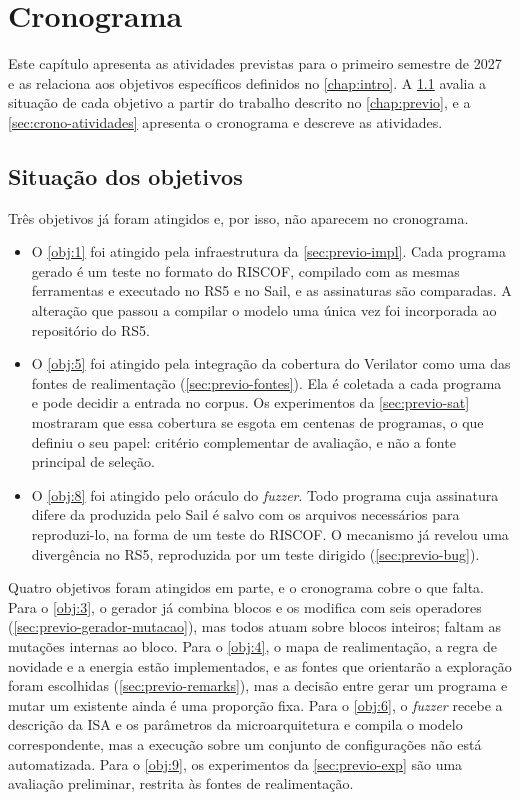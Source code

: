 \chapter{\label{chap:cronograma}Cronograma}

Este capítulo apresenta as atividades previstas para o primeiro semestre de 2027 e as relaciona aos objetivos específicos definidos no \cref{chap:intro}. A \cref{sec:crono-objetivos} avalia a situação de cada objetivo a partir do trabalho descrito no \cref{chap:previo}, e a \cref{sec:crono-atividades} apresenta o cronograma e descreve as atividades.

\section{Situação dos objetivos}\label{sec:crono-objetivos}

Três objetivos já foram atingidos e, por isso, não aparecem no cronograma.

\begin{itemize}
    \item O \cref{obj:1} foi atingido pela infraestrutura da \cref{sec:previo-impl}. Cada programa gerado é um teste no formato do RISCOF, compilado com as mesmas ferramentas e executado no RS5 e no Sail, e as assinaturas são comparadas. A alteração que passou a compilar o modelo uma única vez foi incorporada ao repositório do RS5.

    \item O \cref{obj:5} foi atingido pela integração da cobertura do Verilator como uma das fontes de realimentação (\cref{sec:previo-fontes}). Ela é coletada a cada programa e pode decidir a entrada no corpus. Os experimentos da \cref{sec:previo-sat} mostraram que essa cobertura se esgota em centenas de programas, o que definiu o seu papel: critério complementar de avaliação, e não a fonte principal de seleção.

    \item O \cref{obj:8} foi atingido pelo oráculo do \textit{fuzzer}. Todo programa cuja assinatura difere da produzida pelo Sail é salvo com os arquivos necessários para reproduzi-lo, na forma de um teste do RISCOF. O mecanismo já revelou uma divergência no RS5, reproduzida por um teste dirigido (\cref{sec:previo-bug}).
\end{itemize}

Quatro objetivos foram atingidos em parte, e o cronograma cobre o que falta. Para o \cref{obj:3}, o gerador já combina blocos e os modifica com seis operadores (\cref{sec:previo-gerador-mutacao}), mas todos atuam sobre blocos inteiros; faltam as mutações internas ao bloco. Para o \cref{obj:4}, o mapa de realimentação, a regra de novidade e a energia estão implementados, e as fontes que orientarão a exploração foram escolhidas (\cref{sec:previo-remarks}), mas a decisão entre gerar um programa e mutar um existente ainda é uma proporção fixa. Para o \cref{obj:6}, o \textit{fuzzer} recebe a descrição da ISA e os parâmetros da microarquitetura e compila o modelo correspondente, mas a execução sobre um conjunto de configurações não está automatizada. Para o \cref{obj:9}, os experimentos da \cref{sec:previo-exp} são uma avaliação preliminar, restrita às fontes de realimentação.


